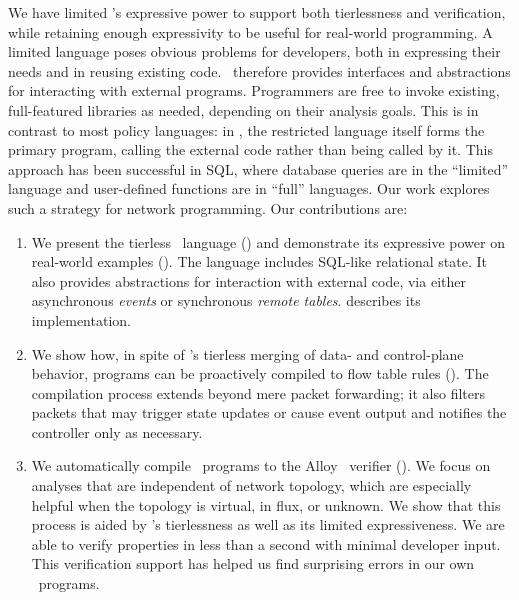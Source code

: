 We have limited \flowlog's expressive power to support both tierlessness and
verification, while retaining enough expressivity to be useful for real-world
programming. A limited language poses obvious problems for
developers, both in expressing their needs and in reusing existing code.
\flowlog\ therefore provides interfaces and abstractions for
interacting with external programs. Programmers are free to invoke existing,
full-featured libraries as needed, depending on their analysis goals. This is
in contrast to most policy languages: in \flowlog, the restricted language
itself forms the primary program, calling the external code rather than being
called by it. This approach has been successful in SQL, where
database queries are in the ``limited'' language and user-defined functions are
in ``full'' languages. Our work explores such a strategy for network
programming. Our contributions are:
\begin{enumerate} 

\item{We present the tierless \flowlog\ language () and
demonstrate its expressive power on real-world examples ().
The language includes SQL-like relational state. It also provides abstractions
for interaction with external code, via either asynchronous \emph{events} or
synchronous \emph{remote tables}.  describes its
implementation.}

\item{We show how, in spite of \flowlog's tierless merging of data- and control-plane behavior, programs
can be proactively compiled to flow table rules (). The compilation process
extends beyond mere packet forwarding; it also filters packets that may trigger
state updates or cause event output and notifies the controller only as necessary.}

\item{We automatically compile \flowlog\ programs to the Alloy~\cite{jackson:alloybook} verifier
(). We focus on analyses that are
independent of network topology, which are especially helpful
when the topology is virtual, in flux, or unknown. 
We show that this process is aided by \flowlog's tierlessness as well as its limited expressiveness.
We are able to verify 
properties in less than a second with minimal developer input. This
verification support has helped us find surprising errors in our own
\flowlog\ programs.}

\end{enumerate}

